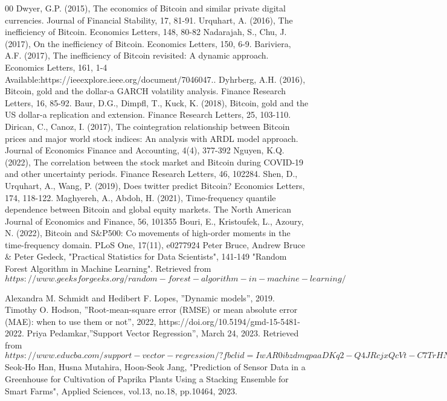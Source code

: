 \documentclass{ieeeojies}
\begin{document}
\begin{thebibliography}{00}
 Dwyer, G.P. (2015), The economics of Bitcoin and similar private digital currencies. Journal of Financial Stability, 17, 81-91.
 Urquhart, A. (2016), The inefficiency of Bitcoin. Economics Letters, 148, 80-82
 Nadarajah, S., Chu, J. (2017), On the inefficiency of Bitcoin. Economics Letters, 150, 6-9.
 Bariviera, A.F. (2017), The inefficiency of Bitcoin revisited: A dynamic approach. Economics Letters, 161, 1-4 Available:https://ieeexplore.ieee.org/document/7046047..
 Dyhrberg, A.H. (2016), Bitcoin, gold and the dollar-a GARCH volatility analysis. Finance Research Letters, 16, 85-92.
 Baur, D.G., Dimpfl, T., Kuck, K. (2018), Bitcoin, gold and the US dollar-a replication and extension. Finance Research Letters, 25, 103-110.
 Dirican, C., Canoz, I. (2017), The cointegration relationship between Bitcoin prices and major world stock indices: An analysis with ARDL 
model approach. Journal of Economics Finance and Accounting, 
4(4), 377-392
  Nguyen, K.Q. (2022), The correlation between the stock market and Bitcoin during COVID-19 and other uncertainty periods. Finance 
Research Letters, 46, 102284.
 Shen, D., Urquhart, A., Wang, P. (2019), Does twitter predict Bitcoin? Economics Letters, 174, 118-122.
 Maghyereh, A., Abdoh, H. (2021), Time-frequency quantile dependence between Bitcoin and global equity markets. The North American Journal of Economics and Finance, 56, 101355
 Bouri, E., Kristoufek, L., Azoury, N. (2022), Bitcoin and S&P500: Comovements of high-order moments in the time-frequency domain. PLoS One, 17(11), e0277924
 Peter Bruce, Andrew Bruce & Peter Gedeck, "Practical Statistics for Data Scientists", 141-149
 "Random Forest Algorithm in Machine Learning". Retrieved from \(https://www.geeksforgeeks.org/random-forest-algorithm-in-machine-learning/\)


 Alexandra M. Schmidt and Hedibert F. Lopes, ''Dynamic models'', 2019. 
 Timothy O. Hodson, ''Root-mean-square error (RMSE) or mean absolute error (MAE): when to use them or not'', 2022, https://doi.org/10.5194/gmd-15-5481-2022.
 Priya Pedamkar,''Support Vector Regression'', March 24, 2023. Retrieved from \(https://www.educba.com/support-vector-regression/?fbclid=IwAR0ibzdmqpaaDKq2-Q4JRcjxQcVt-C7TrHNEc90q_tCSrn8rds9x2AG8Y78\)
 Seok-Ho Han, Husna Mutahira, Hoon-Seok Jang, "Prediction of Sensor Data in a Greenhouse for Cultivation of Paprika Plants Using a Stacking Ensemble for Smart Farms", Applied Sciences, vol.13, no.18, pp.10464, 2023.

\end{thebibliography}


\EOD
\end{document}
